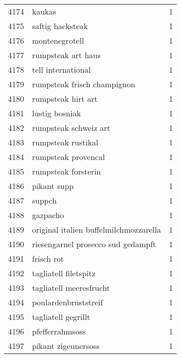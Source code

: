 \begin{tabular}{llr}
4174 &                                             kaukas &      1 \\
4175 &                                   saftig hacksteak &      1 \\
4176 &                                     montenegrotell &      1 \\
4177 &                                 rumpsteak art haus &      1 \\
4178 &                                 tell international &      1 \\
4179 &                        rumpsteak frisch champignon &      1 \\
4180 &                                 rumpsteak hirt art &      1 \\
4181 &                                     lustig bosniak &      1 \\
4182 &                              rumpsteak schweiz art &      1 \\
4183 &                                 rumpsteak rustikal &      1 \\
4184 &                                rumpsteak provencal &      1 \\
4185 &                                rumpsteak forsterin &      1 \\
4186 &                                        pikant supp &      1 \\
4187 &                                             suppch &      1 \\
4188 &                                           gazpacho &      1 \\
4189 &             original italien buffelmilchmozzarella &      1 \\
4190 &                 riesengarnel prosecco sud gedampft &      1 \\
4191 &                                         frisch rot &      1 \\
4192 &                              tagliatell filetspitz &      1 \\
4193 &                            tagliatell meeresfrucht &      1 \\
4194 &                               poulardenbruststreif &      1 \\
4195 &                                tagliatell gegrillt &      1 \\
4196 &                                    pfefferrahmsoss &      1 \\
4197 &                                pikant zigeunersoss &      1 \\

\end{tabular}
